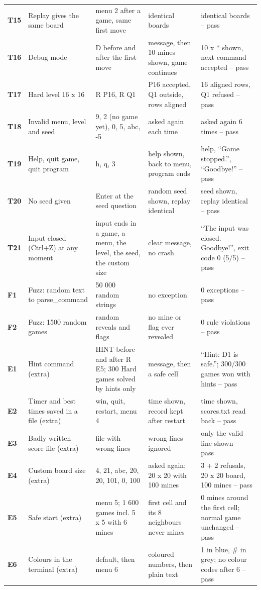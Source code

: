 \documentclass[11pt,a4paper]{article}
\begin{document}
{\begin{longtable}{>{\bfseries}l p{3.2cm} p{3.6cm} p{3.4cm} p{3.6cm}}
T15 & Replay gives the same board & menu 2 after a game, same first move & identical boards & identical boards -- pass\\
T16 & Debug mode & D before and after the first move & message, then 10 mines shown, game continues & 10 x * shown, next command accepted -- pass\\
T17 & Hard level 16 x 16 & R P16, R Q1 & P16 accepted, Q1 outside, rows aligned & 16 aligned rows, Q1 refused -- pass\\
T18 & Invalid menu, level and seed & 9, 2 (no game yet), 0, 5, abc, -5 & asked again each time & asked again 6 times -- pass\\
T19 & Help, quit game, quit program & h, q, 3 & help shown, back to menu, program ends & help, ``Game stopped.'', ``Goodbye!'' -- pass\\
T20 & No seed given & Enter at the seed question & random seed shown, replay identical & seed shown, replay identical -- pass\\
T21 & Input closed (Ctrl+Z) at any moment & input ends in a game, a menu, the level, the seed, the custom size & clear message, no crash & ``The input was closed. Goodbye!'', exit code 0 (5/5) -- pass\\
F1 & Fuzz: random text to parse\_command & 50 000 random strings & no exception & 0 exceptions -- pass\\
F2 & Fuzz: 1500 random games & random reveals and flags & no mine or flag ever revealed & 0 rule violations -- pass\\
E1 & Hint command (extra) & HINT before and after R E5; 300 Hard games solved by hints only & message, then a safe cell & ``Hint: D1 is safe.''; 300/300 games won with hints -- pass\\
E2 & Timer and best times saved in a file (extra) & win, quit, restart, menu 4 & time shown, record kept after restart & time shown, scores.txt read back -- pass\\
E3 & Badly written score file (extra) & file with wrong lines & wrong lines ignored & only the valid line shown -- pass\\
E4 & Custom board size (extra) & 4, 21, abc, 20, 20, 101, 0, 100 & asked again; 20 x 20 with 100 mines & 3 + 2 refusals, 20 x 20 board, 100 mines -- pass\\
E5 & Safe start (extra) & menu 5; 1 600 games incl. 5 x 5 with 6 mines & first cell and its 8 neighbours never mines & 0 mines around the first cell; normal game unchanged -- pass\\
E6 & Colours in the terminal (extra) & default, then menu 6 & coloured numbers, then plain text & 1 in blue, \# in grey; no colour codes after 6 -- pass\\
\bottomrule
\end{longtable}}
\end{document}
